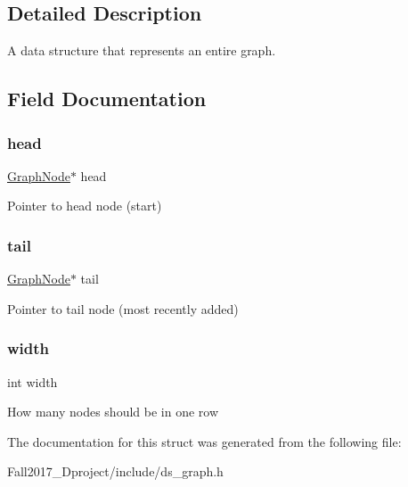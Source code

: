 \subsection{Detailed Description}
A data structure that represents an entire graph. 

\subsection{Field Documentation}
\mbox{\label{structgraph__s_a14d4df7f6c1f9d2c91c64b716680b8c8}} 
\subsubsection{\texorpdfstring{head}{head}}
{\footnotesize\ttfamily \hyperlink{structgraphnode__s}{Graph\+Node}$\ast$ head}

Pointer to head node (start) \mbox{\label{structgraph__s_ac3263bb2bbf0b4404d76fbbba2c036c9}} 
\subsubsection{\texorpdfstring{tail}{tail}}
{\footnotesize\ttfamily \hyperlink{structgraphnode__s}{Graph\+Node}$\ast$ tail}

Pointer to tail node (most recently added) \mbox{\label{structgraph__s_a2474a5474cbff19523a51eb1de01cda4}} 
\subsubsection{\texorpdfstring{width}{width}}
{\footnotesize\ttfamily int width}

How many nodes should be in one row 

The documentation for this struct was generated from the following file\+:\begin{DoxyCompactItemize}
\item 
Fall2017\+\_\+Dproject/include/ds\+\_\+graph.\+h\end{DoxyCompactItemize}
